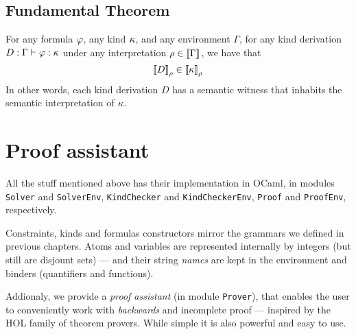 \documentclass[english, mgr]{iithesis}
\begin{document}
\section{Fundamental Theorem}
For any formula $\formphi$, any kind $\kind$, and any environment $\Gamma$, for any kind derivation $D : \types\formphi\kind$ under any interpretation $\tmEnv \in \interp[]{\Gamma}$, we have that
$$
    \interp{D} \in \interp{\kind}
$$
In other words, each kind derivation $D$ has a semantic witness that inhabits the semantic interpretation of $\kind$.
\chapter{Proof assistant}
All the stuff mentioned above has their implementation in OCaml,
in modules \texttt{Solver} and \texttt{SolverEnv},
\texttt{KindChecker} and \texttt{KindCheckerEnv},
\texttt{Proof} and \texttt{ProofEnv}, respectively.

Constraints, kinds and formulas constructors mirror the grammars we defined
in previous chapters.
Atoms and variables are represented internally by integers (but still are disjount sets)
--- and their string \textit{names} are kept in the environment and binders
(quantifiers and functions).

Addionaly, we provide a \textit{proof assistant} (in module \texttt{Prover}),
that enables the user to conveniently work with \textit{backwards} and incomplete
proof --- inspired by the HOL family of theorem provers.
While simple it is also powerful and easy to use.
\end{document}
